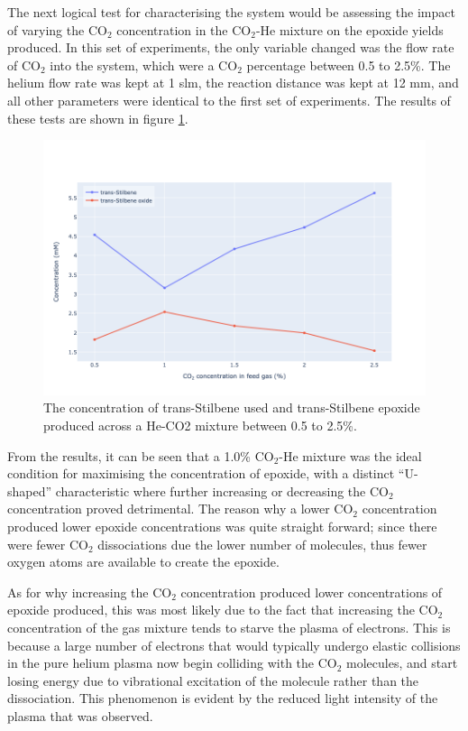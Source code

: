 The next logical test for characterising the system would be assessing the impact of varying the CO$_2$ concentration in the CO$_2$-He mixture on the epoxide yields produced. In this set of experiments, the only variable changed was the flow rate of CO$_2$ into the system, which were a CO$_2$ percentage between 0.5 to 2.5\%. The helium flow rate was kept at 1 slm, the reaction distance was kept at 12 mm, and all other parameters were identical to the first set of experiments. The results of these tests are shown in figure \ref{fig:co2_ts_tse_concentrations}. 

\begin{figure}[h!]
	\centering
    \includegraphics[width=\linewidth]{chapter_6/figures/co2_ts_tse_concentrations.png} 
	\caption{The concentration of trans-Stilbene used and trans-Stilbene epoxide produced across a He-CO2 mixture between 0.5 to 2.5\%.}
	\label{fig:co2_ts_tse_concentrations}
\end{figure} 

From the results, it can be seen that a 1.0\% CO$_2$-He mixture was the ideal condition for maximising the concentration of epoxide, with a distinct ``U-shaped'' characteristic where further increasing or decreasing the CO$_2$ concentration proved detrimental. The reason why a lower CO$_2$ concentration produced lower epoxide concentrations was quite straight forward; since there were fewer CO$_2$ dissociations due the lower number of molecules, thus fewer oxygen atoms are available to create the epoxide. 

As for why increasing the CO$_2$ concentration produced lower concentrations of epoxide produced, this was most likely due to the fact that increasing the CO$_2$ concentration of the gas mixture tends to starve the plasma of electrons. This is because a large number of electrons that would typically undergo elastic collisions in the pure helium plasma now begin colliding with the CO$_2$ molecules, and start losing energy due to vibrational excitation of the molecule rather than the dissociation. This phenomenon is evident by the reduced light intensity of the plasma that was observed. 

